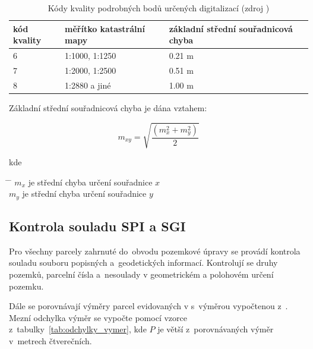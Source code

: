 		\begin{table}[H]
		\begin{tabular}{|l|l|l|}
		\hline
		 kód kvality & měřítko katastrální mapy & základní střední souřadnicová chyba \\
		\hline
		\hline
		 6 & 1:1000, 1:1250 & 0.21 m \\ \hline
		 7 & 1:2000, 1:2500 & 0.51 m \\ \hline
		 8 & 1:2880 a jiné & 1.00 m \\
		 \hline
		\end{tabular}
		 \centering
		  \caption[Kódy kvality podrobných bodů určených digitalizací]{Kódy kvality podrobných bodů určených digitalizací (zdroj \citep{zakon_357})}
		  \label{tab:kody_kvality_digit}
		\end{table}

Základní střední souřadnicová chyba je dána vztahem:

\begin{equation}
	m_{xy} = \sqrt{\frac{(m_{x}^{2}+{m_{y}^{2}})}{2}}
\end{equation}

kde
\begin{tabbing}
\hspace{2em} \= \hspace{5em} \= \kill
	\> $m_{x}$	\> je střední chyba určení souřadnice $x$ \\
	\> $m_{y}$	\> je střední chyba určení souřadnice $y$
\end{tabbing}

\subsection{Kontrola souladu SPI a SGI}
\label{soulad_spi_sgi}

Pro všechny parcely zahrnuté do~obvodu pozemkové úpravy se provádí kontrola souladu souboru popisných a~geodetických informací. Kontrolují se druhy pozemků, parcelní čísla a~nesoulady v geometrickém a polohovém určení pozemku. 

Dále se porovnávají výměry parcel evidovaných v  s~výměrou vypočtenou z~. Mezní odchylka výměr se vypočte pomocí vzorce z~tabulky~\ref{tab:odchylky_vymer}, kde $P$ je větší z~porovnávaných výměr v~metrech čtverečních.

